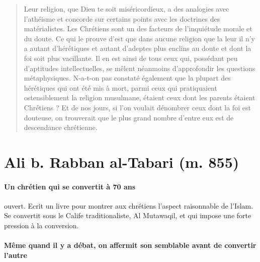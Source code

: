 \begin{quote}
Leur religion, que Dieu te soit miséricordieux, a des analogies avec l'athéisme et concorde sur certains points avec les doctrines des matérialistes. Les Chrétiens sont un des facteurs de l'inquiétude morale et du doute. Ce qui le prouve d'est que dans aucune religion que la leur il n'y a autant d'hérétiques et autant d'adeptes plus enclins au doute et dont la foi soit plus vacillante. Il en est ainsi de tous ceux qui, possédant peu d'aptitudes intellectuelles, se mêlent néanmoins d'approfondir les questions métaphysiques. N-a-t-on pas constaté également que la plupart des hérétiques qui ont été mis à mort, parmi ceux qui pratiquaient ostensiblement la religion musulmane, étaient ceux dont les parents étaient Chrétiens ? Et de nos jours, si l'on voulait dénombrer ceux dont la foi est douteuse, on trouverait que le plus grand nombre d'entre eux est de descendance chrétienne.
\end{quote}

\section{Ali b. Rabban al-Tabari (m. 855)} 

\paragraph{Un chrétien qui se convertit à 70 ans} ouvert. Ecrit un livre pour montrer aux chrétiens l'aspect raisonnable de l'Islam. Se convertit sous le Calife traditionaliste, Al Mutawaqil, et qui impose une forte pression à la conversion.


\paragraph{Même quand il y a débat, on affermit son semblable avant de convertir l'autre} 

